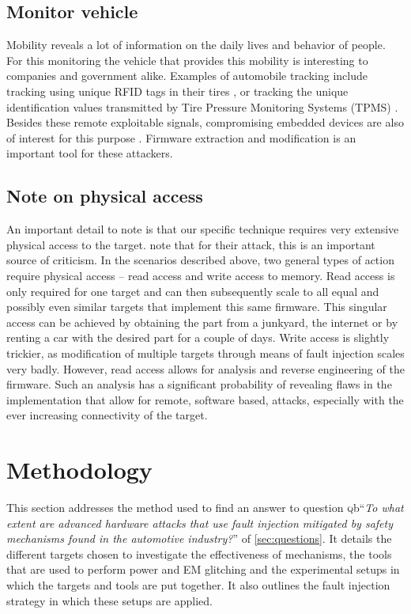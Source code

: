 \documentclass[10pt]{article}
\newcommand{\Qb}{\textsc{q}b\xspace}
\begin{document}
      \subsection{Monitor vehicle}
      \label{sec:monitor}

        Mobility reveals a lot of information on the daily lives and behavior of people. For this monitoring the vehicle that provides this mobility is interesting to companies and government alike. Examples of automobile tracking include tracking using unique RFID tags in their tires \cite{schneier_tracking_2006}, or tracking the unique identification values transmitted by Tire Pressure Monitoring Systems (TPMS) \cite{schneier_tracking_2008-1}. Besides these remote exploitable signals, compromising embedded devices are also of interest for this purpose \cite{wikileaks_vault7_2017}. Firmware extraction and modification is an important tool for these attackers.


        \subsection{Note on physical access}
        An important detail to note is that our specific technique requires very extensive physical access to the target. \citet{checkoway_comprehensive_2011} note that for their attack,  this is an important source of criticism. In the scenarios described above, two general types of action require physical access -- read access and write access to memory. Read access is only required for one target and can then subsequently scale to all equal and possibly even similar targets that implement this same firmware. This singular access can be achieved by obtaining the part from a junkyard, the internet or by renting a car with the desired part for a couple of days. Write access is slightly trickier, as modification of multiple targets through means of fault injection scales very badly. However, read access allows for analysis and reverse engineering of the firmware. Such an analysis has a significant probability of revealing flaws in the implementation that allow for remote, software based, attacks, especially with the ever increasing connectivity of the target.


\newpage
\section{Methodology }
\label{sec:methodology}

  This section addresses the method used to find an answer to question \Qb ``\emph{To what extent are advanced hardware attacks that use fault injection mitigated by safety mechanisms found in the automotive industry?}'' of \autoref{sec:questions}. It details the different targets chosen to investigate the effectiveness of mechanisms, the tools that are used to perform power and EM glitching and the experimental setups in which the targets and tools are put together. It also outlines the fault injection strategy in which these setups are applied. 
\end{document}
